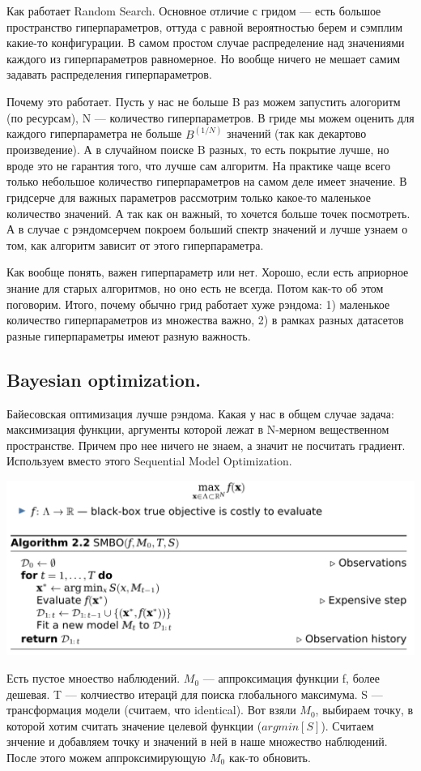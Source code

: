 \documentclass[12pt]{article}
\begin{document}
Как работает Random Search. Основное отличие с гридом --- есть большое пространство гиперпараметров, оттуда с равной вероятностью берем и сэмплим какие-то конфигурации. В самом простом случае распределение над значениями каждого из гиперпараметров равномерное. Но вообще ничего не мешает самим задавать распределения гиперпараметров.
    
Почему это работает. Пусть у нас не больше B раз можем запустить алогоритм (по ресурсам), N --- количество гиперпараметров. В гриде мы можем оценить для каждого гиперпараметра не больше $B^(1/N)$ значений (так как декартово произведение). А в случайном поиске B разных, то есть покрытие лучше, но вроде это не гарантия того, что лучше сам алгоритм. На практике чаще всего только небольшое количество гиперпараметров на самом деле имеет значение. В гридсерче для важных параметров рассмотрим только какое-то маленькое количество значений. А так как он важный, то хочется больше точек посмотреть. А в случае с рэндомсерчем покроем больший спектр значений и лучше узнаем о том, как алгоритм зависит от этого гиперпараметра.

Как вообще понять, важен гиперпараметр или нет. Хорошо, если есть априорное знание для старых алгоритмов, но оно есть не всегда. Потом как-то об этом поговорим. Итого, почему обычно грид работает хуже рэндома: 1) маленькое количество гиперпараметров из множества важно, 2) в рамках разных датасетов разные гиперпараметры имеют разную важность.

\subsection{Bayesian optimization.}
Байесовская оптимизация лучше рэндома. Какая у нас в общем случае задача: максимизация функции, аргументы которой лежат в N-мерном вещественном пространстве. Причем про нее ничего не знаем, а значит не посчитать градиент. Используем вместо этого Sequential Model Optimization.
\begin{center}
    \includegraphics[scale=0.4]{lecture7_seq_opt.png}
\end{center}
Есть пустое мноество наблюдений. $M_0$ --- аппроксимация функции f, более дешевая. T --- колчиество итерацй для поиска глобального максимума. S --- трансформация модели (считаем, что identical). Вот взяли $M_0$, выбираем точку, в которой хотим считать значение целевой функции ($argmin[S]$). Считаем знчение и добавляем точку и значений в ней в наше множество наблюдений. После этого можем аппроксимирующую $M_0$ как-то обновить.
    
\end{document}
